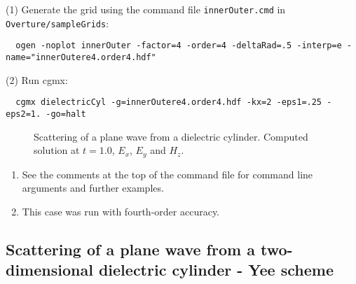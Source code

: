\noindent (1) Generate the grid using the command file {\tt innerOuter.cmd} in {\tt Overture/sampleGrids}:
{\small
\begin{verbatim}
  ogen -noplot innerOuter -factor=4 -order=4 -deltaRad=.5 -interp=e -name="innerOutere4.order4.hdf"
\end{verbatim}
}
\noindent (2) Run cgmx: 
\begin{verbatim}
  cgmx dielectricCyl -g=innerOutere4.order4.hdf -kx=2 -eps1=.25 -eps2=1. -go=halt
\end{verbatim}

{
\begin{figure}[hbt]
\newcommand{\figWidth}{5.5cm}
\newcommand{\trimfig}[2]{\trimFig{#1}{#2}{0.1}{0.05}{.05}{.05}}
\begin{center}
\end{center}
\caption{Scattering of a plane wave from a dielectric cylinder. Computed solution at $t=1.0$, $E_x$, $E_y$ and $H_z$.}
\label{fig:cyl2dDielectricScat}
\end{figure}
}

\begin{enumerate}
  \item See the comments at the top of the command file for command line arguments and further examples.
  \item This case was run with fourth-order accuracy.
\end{enumerate}


\clearpage
\subsection{Scattering of a plane wave from a two-dimensional dielectric cylinder - Yee scheme} \label{sec:cyl2dDielectricScat}

